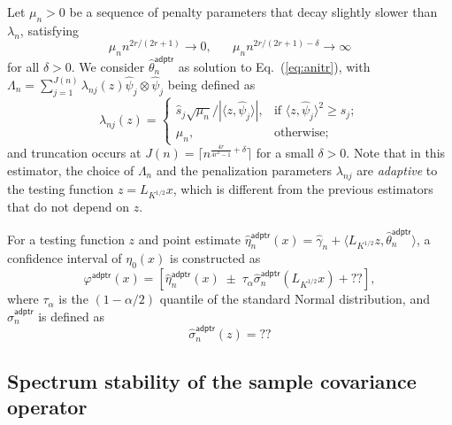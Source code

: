 \documentclass[11pt,a4paper]{article}
\renewcommand{\hat}{\widehat}
\theoremstyle{definition}
\theoremstyle{plain}
\theoremstyle{remark}
\newcommand{\adptr}{\mathsf{adptr}}
\begin{document}
Let $\mu_n>0$ be a sequence of penalty parameters that decay slightly slower than $\lambda_n$, satisfying
\begin{equation}
\mu_n n^{2r/(2r+1)}\to 0,\;\;\;\;\;\;\mu_n n^{2r/(2r+1)-\delta}\to\infty
\label{eq:mun}
\end{equation}
for all $\delta>0$.
We consider $\hat\theta_n^\adptr$ as solution to Eq.~(\ref{eq:anitr}), with $\Lambda_n=\sum_{j=1}^{J(n)}\lambda_{nj}(z)\hat\psi_j\otimes\hat\psi_j$ being defined as
$$
\lambda_{nj}(z) = \left\{\begin{array}{ll}\hat s_j\sqrt{\mu_n}/|\langle z,\hat\psi_j\rangle|,&\text{if } \langle z,\hat\psi_j\rangle^2\geq\hat s_j;\\ \mu_n,& \text{otherwise};\end{array}\right.
$$
and truncation occurs at $J(n)=\lceil n^{\frac{4r}{4r^2-1}+\delta}\rceil$ for a small $\delta>0$.
Note that in this estimator, the choice of $\Lambda_n$ and the penalization parameters $\lambda_{nj}$ are \emph{adaptive} to the testing function $z=L_{K^{1/2}}x$,
which is different from the previous estimators that do not depend on $z$.

For a testing function $z$ and point estimate $\hat\eta_n^\adptr(x)=\hat\gamma_n+\langle L_{K^{1/2}}z,\hat\theta_n^\adptr\rangle$, a confidence interval of $\eta_0(x)$ is constructed as
$$
\varphi^\adptr(x) = [\hat\eta_n^\adptr(x)\;\pm\;\tau_{\alpha}\hat\sigma_n^\adptr(L_{K^{1/2}}x)+??],
$$
where $\tau_{\alpha}$ is the $(1-\alpha/2)$ quantile of the standard Normal distribution, and $\hat\sigma_n^\adptr$ is defined as
$$
\hat\sigma_n^\adptr(z) = ??
$$


\subsection{Spectrum stability of the sample covariance operator}
\end{document}
